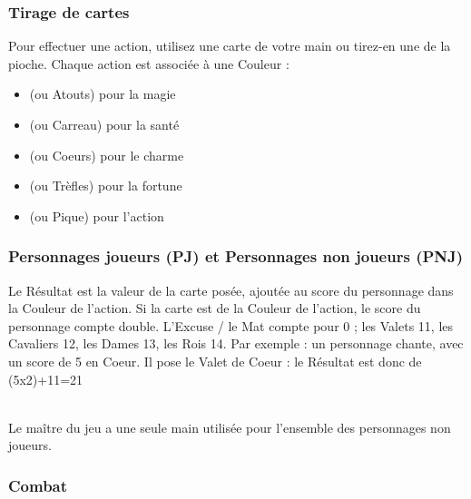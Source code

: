 \documentclass[11pt,twoside,a4paper]{article}
\begin{document}
\begin{minipage}[ht]{0.40\textwidth}

	\subsubsection{Tirage de cartes}
	
	Pour effectuer une action, utilisez une carte de votre main ou tirez-en une de la pioche.
	Chaque action est associ{\'e}e {\`a} une Couleur :
	\begin{itemize}
		\item[Arcanes] (ou Atouts) pour la magie
		\item[B{\^a}tons] (ou Carreau) pour la sant{\'e}
		\item[Coupes] (ou Coeurs) pour le charme
		\item[Deniers] (ou Tr{\`e}fles) pour la fortune
		\item[Ep{\'e}es] (ou Pique) pour l'action
	\end{itemize}

\end{minipage} \hfill \begin{minipage}[ht]{0.54\textwidth}

	\subsubsection{Personnages joueurs (PJ) et Personnages non joueurs (PNJ)}
	
	Le R{\'e}sultat est la valeur de la carte pos{\'e}e, ajout{\'e}e au score du personnage dans la Couleur de l'action. Si la carte est de la Couleur de l'action, le score du personnage compte double.
	L'Excuse / le Mat compte pour 0 ; les Valets 11, les Cavaliers 12, les Dames 13, les Rois 14. 
	Par exemple : un personnage chante, avec un score de 5 en Coeur. Il pose le Valet de Coeur : le R{\'e}sultat est donc de (5x2)+11=21

\end{minipage}~\\

Le ma{\^i}tre du jeu a une seule main utilis{\'e}e pour l'ensemble des personnages non joueurs.

\subsubsection{Combat}
\end{document}
